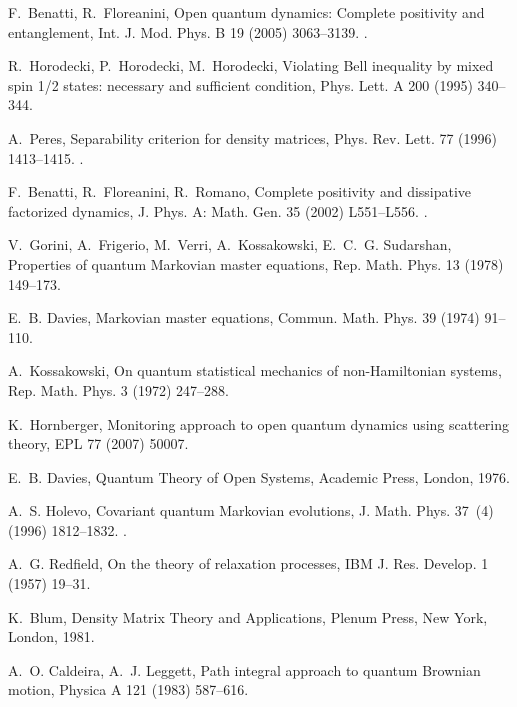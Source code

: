 \documentclass[3p,sort&compress]{elsarticle}
\begin{document}
\begin{thebibliography}{100}
F.~Benatti, R.~Floreanini, Open quantum dynamics: Complete positivity and
  entanglement, Int. J. Mod. Phys. B 19 (2005) 3063--3139.
\newblock \href {http://dx.doi.org/10.1142/S0217979205032097}
  {}.

R.~Horodecki, P.~Horodecki, M.~Horodecki, Violating {B}ell inequality by mixed
  spin 1/2 states: necessary and sufficient condition, Phys. Lett. A 200 (1995)
  340--344.

A.~Peres, Separability criterion for density matrices, Phys. Rev. Lett. 77
  (1996) 1413--1415.
\newblock \href {http://dx.doi.org/10.1103/PhysRevLett.77.1413}
  {}.

F.~Benatti, R.~Floreanini, R.~Romano, Complete positivity and dissipative
  factorized dynamics, J. Phys. A: Math. Gen. 35 (2002) L551--L556.
\newblock \href {http://dx.doi.org/10.1088/0305-4470/35/39/101}
  {}.

V.~Gorini, A.~Frigerio, M.~Verri, A.~Kossakowski, E.~C.~G. Sudarshan,
  Properties of quantum {M}arkovian master equations, Rep. Math. Phys. 13
  (1978) 149--173.

E.~B. Davies, Markovian master equations, Commun. Math. Phys. 39 (1974)
  91--110.

A.~Kossakowski, On quantum statistical mechanics of non-{H}amiltonian systems,
  Rep. Math. Phys. 3 (1972) 247--288.

K.~Hornberger, Monitoring approach to open quantum dynamics using scattering
  theory, EPL 77 (2007) 50007.

E.~B. Davies, Quantum Theory of Open Systems, Academic Press, London, 1976.

A.~S. Holevo, Covariant quantum {M}arkovian evolutions, J. Math. Phys. 37~(4)
  (1996) 1812--1832.
\newblock \href {http://dx.doi.org/10.1063/1.531481}
  {}.

A.~G. Redfield, On the theory of relaxation processes, IBM J. Res. Develop. 1
  (1957) 19--31.

K.~Blum, Density Matrix Theory and Applications, Plenum Press, New York,
  London, 1981.

A.~O. Caldeira, A.~J. Leggett, Path integral approach to quantum {B}rownian
  motion, Physica A 121 (1983) 587--616.


\end{thebibliography}
\end{document}
